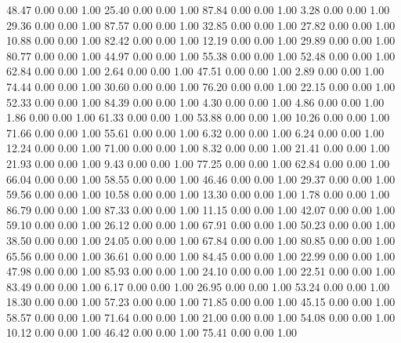    48.47   0.00   0.00   1.00
   25.40   0.00   0.00   1.00
   87.84   0.00   0.00   1.00
    3.28   0.00   0.00   1.00
   29.36   0.00   0.00   1.00
   87.57   0.00   0.00   1.00
   32.85   0.00   0.00   1.00
   27.82   0.00   0.00   1.00
   10.88   0.00   0.00   1.00
   82.42   0.00   0.00   1.00
   12.19   0.00   0.00   1.00
   29.89   0.00   0.00   1.00
   80.77   0.00   0.00   1.00
   44.97   0.00   0.00   1.00
   55.38   0.00   0.00   1.00
   52.48   0.00   0.00   1.00
   62.84   0.00   0.00   1.00
    2.64   0.00   0.00   1.00
   47.51   0.00   0.00   1.00
    2.89   0.00   0.00   1.00
   74.44   0.00   0.00   1.00
   30.60   0.00   0.00   1.00
   76.20   0.00   0.00   1.00
   22.15   0.00   0.00   1.00
   52.33   0.00   0.00   1.00
   84.39   0.00   0.00   1.00
    4.30   0.00   0.00   1.00
    4.86   0.00   0.00   1.00
    1.86   0.00   0.00   1.00
   61.33   0.00   0.00   1.00
   53.88   0.00   0.00   1.00
   10.26   0.00   0.00   1.00
   71.66   0.00   0.00   1.00
   55.61   0.00   0.00   1.00
    6.32   0.00   0.00   1.00
    6.24   0.00   0.00   1.00
   12.24   0.00   0.00   1.00
   71.00   0.00   0.00   1.00
    8.32   0.00   0.00   1.00
   21.41   0.00   0.00   1.00
   21.93   0.00   0.00   1.00
    9.43   0.00   0.00   1.00
   77.25   0.00   0.00   1.00
   62.84   0.00   0.00   1.00
   66.04   0.00   0.00   1.00
   58.55   0.00   0.00   1.00
   46.46   0.00   0.00   1.00
   29.37   0.00   0.00   1.00
   59.56   0.00   0.00   1.00
   10.58   0.00   0.00   1.00
   13.30   0.00   0.00   1.00
    1.78   0.00   0.00   1.00
   86.79   0.00   0.00   1.00
   87.33   0.00   0.00   1.00
   11.15   0.00   0.00   1.00
   42.07   0.00   0.00   1.00
   59.10   0.00   0.00   1.00
   26.12   0.00   0.00   1.00
   67.91   0.00   0.00   1.00
   50.23   0.00   0.00   1.00
   38.50   0.00   0.00   1.00
   24.05   0.00   0.00   1.00
   67.84   0.00   0.00   1.00
   80.85   0.00   0.00   1.00
   65.56   0.00   0.00   1.00
   36.61   0.00   0.00   1.00
   84.45   0.00   0.00   1.00
   22.99   0.00   0.00   1.00
   47.98   0.00   0.00   1.00
   85.93   0.00   0.00   1.00
   24.10   0.00   0.00   1.00
   22.51   0.00   0.00   1.00
   83.49   0.00   0.00   1.00
    6.17   0.00   0.00   1.00
   26.95   0.00   0.00   1.00
   53.24   0.00   0.00   1.00
   18.30   0.00   0.00   1.00
   57.23   0.00   0.00   1.00
   71.85   0.00   0.00   1.00
   45.15   0.00   0.00   1.00
   58.57   0.00   0.00   1.00
   71.64   0.00   0.00   1.00
   21.00   0.00   0.00   1.00
   54.08   0.00   0.00   1.00
   10.12   0.00   0.00   1.00
   46.42   0.00   0.00   1.00
   75.41   0.00   0.00   1.00
